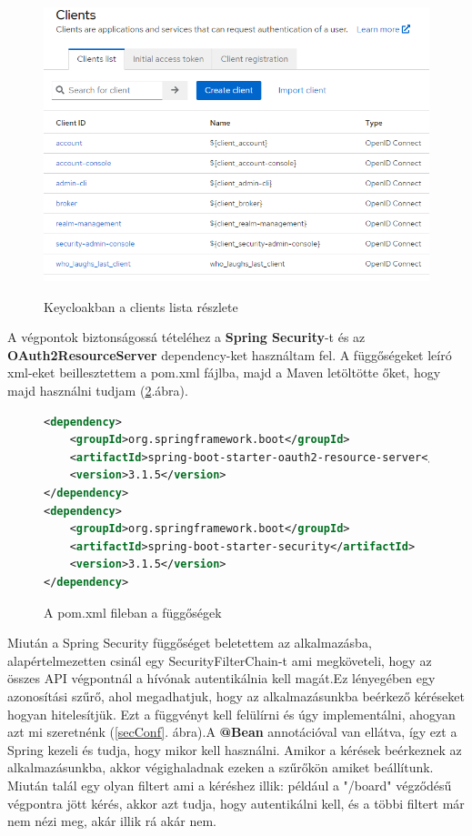 \documentclass[a4paper,twoside]{article}
\begin{document}
\begin{figure}
	\caption{Keycloakban a clients lista részlete}
	\centering
	\includegraphics[scale=0.5]{keycloak-cients}
	\label{keycloak}
\end{figure}
\FloatBarrier


A végpontok biztonságossá tételéhez a \textbf{Spring Security}-t és az \\ \textbf{OAuth2ResourceServer} dependency-ket használtam fel. A függőségeket leíró xml-eket beillesztettem a pom.xml fájlba, majd a Maven letöltötte őket, hogy majd használni tudjam (\ref{pom}.ábra).
\begin{figure}
	\caption{A pom.xml fileban a függőségek}
	\centering
	\begin{lstlisting}[language=XML,breaklines=true]
<dependency>
	<groupId>org.springframework.boot</groupId>
	<artifactId>spring-boot-starter-oauth2-resource-server</artifactId>
	<version>3.1.5</version>
</dependency>
<dependency>
	<groupId>org.springframework.boot</groupId>
	<artifactId>spring-boot-starter-security</artifactId>
	<version>3.1.5</version>
</dependency>
	\end{lstlisting}
	\label{pom}
\end{figure}
\FloatBarrier


Miután a Spring Security függőséget beletettem az alkalmazásba, alapértelmezetten csinál egy SecurityFilterChain-t ami megköveteli, hogy az összes API végpontnál
a hívónak autentikálnia kell magát.Ez lényegében egy azonosítási szűrő, ahol megadhatjuk, hogy az alkalmazásunkba beérkező kéréseket hogyan hitelesítjük. Ezt a függvényt kell felülírni és úgy implementálni, ahogyan azt mi szeretnénk (\ref{secConf}. ábra).A \textbf{@Bean} annotációval van ellátva,
így ezt a Spring kezeli és tudja, hogy mikor kell használni. Amikor a kérések beérkeznek az alkalmazásunkba, akkor végighaladnak ezeken a szűrőkön amiket beállítunk. Miután talál 
egy olyan filtert ami a kéréshez illik: például a "/board" végződésű végpontra jött kérés, akkor azt tudja, hogy autentikálni kell, és a többi filtert már nem nézi meg, akár illik rá akár nem. 
\end{document}
